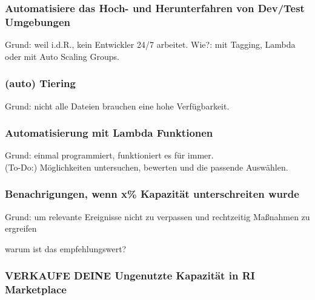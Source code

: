 \subsubsection{Automatisiere das Hoch- und Herunterfahren von Dev/Test Umgebungen}
Grund: weil i.d.R., kein Entwickler 24/7 arbeitet.
Wie?: mit Tagging, Lambda oder mit Auto Scaling Groups.

\subsubsection{(auto) Tiering }
Grund: nicht alle Dateien brauchen eine hohe Verfügbarkeit.

\subsubsection{Automatisierung mit Lambda Funktionen}
Grund: einmal programmiert, funktioniert es für immer.
\\(To-Do:) Möglichkeiten untersuchen, bewerten und die passende Auswählen.
\subsubsection{Benachrigungen, wenn x\% Kapazität unterschreiten wurde}
Grund: um relevante Ereignisse nicht zu verpassen und rechtzeitig Maßnahmen zu ergreifen

warum ist das empfehlungswert?

\subsubsection{VERKAUFE DEINE Ungenutzte Kapazität in RI Marketplace}



  

 